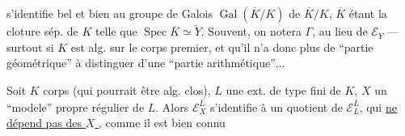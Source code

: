 
s'identifie bel et bien au groupe de Galois $\operatorname{Gal}(\overline K/K)$ de  $\overline K/K$, $\overline K$ étant la cloture sép. de $K$ telle que $\operatorname{Spec}\overline K\simeq\widetilde Y$. Souvent, on notera $\Gamma$,  au lieu de $\mathcal E_Y$ --- surtout si $K$ est alg. sur le corps premier, et qu'il n'a donc plus de ``partie géométrique'' à distinguer d'une ``partie arithmétique''$\ldots$

Soit  $K$  corps (qui pourrait être alg. clos), $L$ une ext. de type fini de $K$, $X$ un ``modele'' propre régulier de $L$. Alors $\mathcal E_X^{\overline L}$ s'identifie à un quotient de $\mathcal E_L^{\overline L}$, qui \uline{ne  dépend pas des  $X$ }, comme il est bien connu

